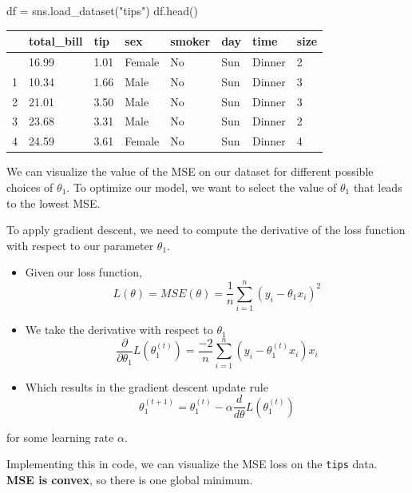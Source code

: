 \documentclass[
  letterpaper,
  DIV=11,
  numbers=noendperiod]{scrreprt}
\newenvironment{Shaded}{\begin{snugshade}}{\end{snugshade}}
\newcommand{\NormalTok}[1]{\textcolor[rgb]{0.00,0.23,0.31}{#1}}
\newcommand{\OperatorTok}[1]{\textcolor[rgb]{0.37,0.37,0.37}{#1}}
\newcommand{\StringTok}[1]{\textcolor[rgb]{0.13,0.47,0.30}{#1}}
\providecommand{\tightlist}{%
  \setlength{\itemsep}{0pt}\setlength{\parskip}{0pt}}\usepackage{longtable,booktabs,array}
\begin{document}
\begin{Shaded}
\begin{Highlighting}[]
\NormalTok{df }\OperatorTok{=}\NormalTok{ sns.load\_dataset(}\StringTok{"tips"}\NormalTok{)}
\NormalTok{df.head()}
\end{Highlighting}
\end{Shaded}

\begin{longtable}[]{@{}llllllll@{}}
\toprule\noalign{}
& total\_bill & tip & sex & smoker & day & time & size \\
\midrule\noalign{}
\endhead
\bottomrule\noalign{}
\endlastfoot
0 & 16.99 & 1.01 & Female & No & Sun & Dinner & 2 \\
1 & 10.34 & 1.66 & Male & No & Sun & Dinner & 3 \\
2 & 21.01 & 3.50 & Male & No & Sun & Dinner & 3 \\
3 & 23.68 & 3.31 & Male & No & Sun & Dinner & 2 \\
4 & 24.59 & 3.61 & Female & No & Sun & Dinner & 4 \\
\end{longtable}

We can visualize the value of the MSE on our dataset for different
possible choices of \(\theta_1\). To optimize our model, we want to
select the value of \(\theta_1\) that leads to the lowest MSE.

To apply gradient descent, we need to compute the derivative of the loss
function with respect to our parameter \(\theta_1\).

\begin{itemize}
\tightlist
\item
  Given our loss function,
  \[L(\theta) = MSE(\theta) = \frac{1}{n} \sum_{i=1}^n (y_i - \theta_1x_i)^2\]
\item
  We take the derivative with respect to \(\theta_1\)
  \[\frac{\partial}{\partial \theta_{1}} L(\theta_1^{(t)}) = \frac{-2}{n} \sum_{i=1}^n (y_i - \theta_1^{(t)} x_i) x_i\]
\item
  Which results in the gradient descent update rule
  \[\theta_1^{(t+1)} = \theta_1^{(t)} - \alpha \frac{d}{d\theta}L(\theta_1^{(t)})\]
\end{itemize}

for some learning rate \(\alpha\).

Implementing this in code, we can visualize the MSE loss on the
\texttt{tips} data. \textbf{MSE is convex}, so there is one global
minimum.
\end{document}
